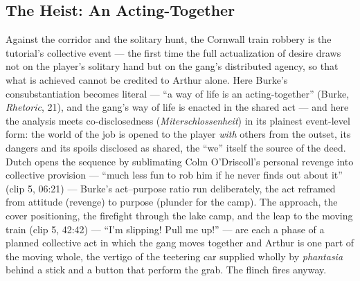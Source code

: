\documentclass{article}
\begin{document}
\bigskip

\subsection*{The Heist: An Acting-Together}

Against the corridor and the solitary hunt, the Cornwall train robbery is the tutorial's collective event — the first time the full actualization of desire draws not on the player's solitary hand but on the gang's distributed agency, so that what is achieved cannot be credited to Arthur alone. Here Burke's consubstantiation becomes literal — ``a way of life is an acting-together'' (Burke, \textit{Rhetoric}, 21), and the gang's way of life is enacted in the shared act — and here the analysis meets co-disclosedness (\textit{Miterschlossenheit}) in its plainest event-level form: the world of the job is opened to the player \textit{with} others from the outset, its dangers and its spoils disclosed as shared, the ``we'' itself the source of the deed. Dutch opens the sequence by sublimating Colm O'Driscoll's personal revenge into collective provision — ``much less fun to rob him if he never finds out about it'' (clip 5, 06:21) — Burke's act–purpose ratio run deliberately, the act reframed from attitude (revenge) to purpose (plunder for the camp). The approach, the cover positioning, the firefight through the lake camp, and the leap to the moving train (clip 5, 42:42) — ``I'm slipping! Pull me up!'' — are each a phase of a planned collective act in which the gang moves together and Arthur is one part of the moving whole, the vertigo of the teetering car supplied wholly by \textit{phantasia} behind a stick and a button that perform the grab. The flinch fires anyway.
\end{document}
